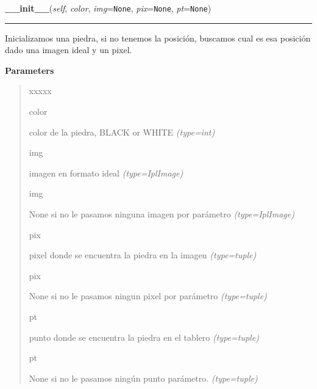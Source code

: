 \hspace{.8\funcindent}\begin{boxedminipage}{\funcwidth}

    \raggedright \textbf{\_\_init\_\_}(\textit{self}, \textit{color}, \textit{img}={\tt None}, \textit{pix}={\tt None}, \textit{pt}={\tt None})

    \vspace{-1.5ex}

    \rule{\textwidth}{0.5\fboxrule}
\setlength{\parskip}{2ex}
Inicializamos una piedra, si no tenemos la posición, buscamos cual es esa posición dado una imagen ideal y un pixel.

\setlength{\parskip}{1ex}
      \textbf{Parameters}
      \vspace{-1ex}

      \begin{quote}
        \begin{Ventry}{xxxxx}

          \item[color]


color de la piedra, BLACK or WHITE
            {\it (type=int)}

          \item[img]


imagen en formato ideal
            {\it (type=IplImage)}

          \item[img]


None si no le pasamos ninguna imagen por parámetro
            {\it (type=IplImage)}

          \item[pix]


pixel donde se encuentra la piedra en la imagen
            {\it (type=tuple)}

          \item[pix]


None si no le pasamos ningun pixel por parámetro
            {\it (type=tuple)}

          \item[pt]


punto donde se encuentra la piedra en el tablero
            {\it (type=tuple)}

          \item[pt]


None si no le pasamos ningún punto parámetro.
            {\it (type=tuple)}

        \end{Ventry}

      \end{quote}

    \end{boxedminipage}

